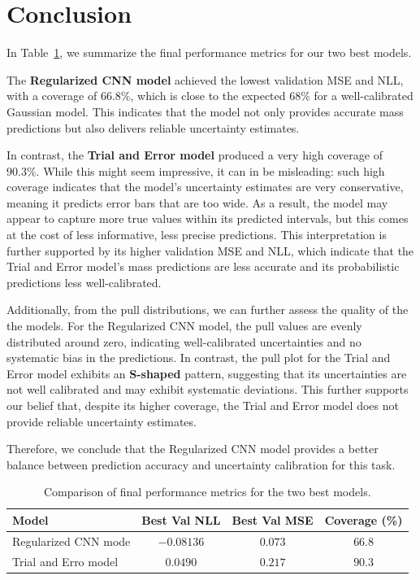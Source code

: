 \section{Conclusion}

In Table~\ref{tab:model-comparison}, we summarize 
the final performance metrics for our two best models.

The \textbf{Regularized CNN model} achieved the lowest 
validation MSE and NLL, with a coverage of $66.8\%$, 
which is close to the expected $68\%$ for a well-calibrated 
Gaussian model. This indicates that the model not only 
provides accurate mass predictions but also delivers reliable 
uncertainty estimates.

In contrast, the \textbf{Trial and Error model} produced a 
very high coverage of $90.3\%$. While this might 
seem impressive, it can in be misleading: 
such high coverage indicates that the model's uncertainty 
estimates are very conservative, meaning it predicts error 
bars that are too wide. As a result, the model may appear to 
capture more true values within its predicted intervals, 
but this comes at the cost of less informative, less precise 
predictions. This interpretation is further supported by its 
higher validation MSE and NLL, which indicate that the Trial 
and Error model’s mass predictions are less accurate and its 
probabilistic predictions less well-calibrated.

Additionally, from the pull distributions, 
we can further assess the quality of the the models.
For the Regularized CNN model, 
the pull values are evenly distributed around zero, 
indicating well-calibrated uncertainties and no systematic
bias in the predictions. In contrast, the pull plot 
for the Trial and Error model exhibits an \textbf{S-shaped}
pattern, suggesting that its uncertainties are not well 
calibrated and may exhibit systematic deviations. This 
further supports our belief that, despite its higher
coverage, the Trial and Error model does not provide 
reliable uncertainty estimates.

Therefore, we conclude that the Regularized CNN model 
provides a better balance between prediction accuracy and 
uncertainty calibration for this task.

\begin{table}[ht]
    \centering
    \caption{Comparison of final performance metrics for the two best models.}
    \label{tab:model-comparison}
    \begin{tabular}{|l|c|c|c|}
        \hline
        \textbf{Model} & \textbf{Best Val NLL} & \textbf{Best Val MSE} & \textbf{Coverage (\%)} \\
        \hline
        Regularized CNN mode & $-0.08136$ & $0.073$ & $66.8$ \\
        Trial and Erro model & $0.0490$   & $0.217$ & $90.3$ \\
        \hline
    \end{tabular}
\end{table}

